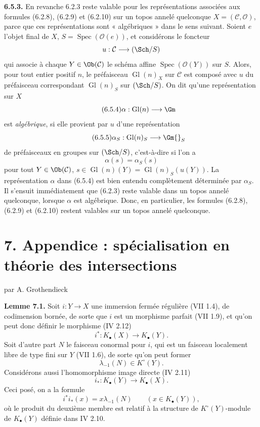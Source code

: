 \documentclass[11pt]{article}
\newcommand{\Spec}{\operatorname{Spec}}
\providecommand{\Gl}{\operatorname{Gl}}
\begin{document}
\textbf{6.5.3.} En revanche 6.2.3 reste valable pour les représentations associées aux formules (6.2.8), (6.2.9) et (6.2.10) sur un topos annelé quelconque \(X=(\mathcal C,\mathcal O)\), parce que ces représentations sont « algébriques » dans le sens suivant. Soient \(e\) l'objet final de \(X\), \(S=\Spec(\mathcal O(e))\), et considérons le foncteur
\[
 u:\mathcal C\longrightarrow(\Sch/S)
\]
qui associe à chaque \(Y\in\Ob(\mathcal C)\) le schéma affine \(\Spec(\mathcal O(Y))\) sur \(S\). Alors, pour tout entier positif \(n\), le préfaisceau \(\Gl(n)_X\) sur \(\mathcal C\) est composé avec \(u\) du préfaisceau correspondant \(\Gl(n)_S\) sur \((\Sch/S)\). On dit qu'une représentation sur \(X\)
\begin{equation}\tag{6.5.4}
 \alpha:\Gl(n)\longrightarrow\Gm
\end{equation}
est \emph{algébrique}, si elle provient par \(u\) d'une représentation
\begin{equation}\tag{6.5.5}
 \alpha_S:\Gl(n)_S\longrightarrow\Gm{}_{S}
\end{equation}
de préfaisceaux en groupes sur \((\Sch/S)\), c'est-à-dire si l'on a
\[
 \alpha(s)=\alpha_S(s)
\]
pour tout \(Y\in\Ob(\mathcal C)\), \(s\in\Gl(n)(Y)=\Gl(n)_S(u(Y))\). La représentation \(\alpha\) dans (6.5.4) est bien entendu complètement déterminée par \(\alpha_S\). Il s'ensuit immédiatement que (6.2.3) reste valable dans un topos annelé quelconque, lorsque \(\alpha\) est algébrique. Donc, en particulier, les formules (6.2.8), (6.2.9) et (6.2.10) restent valables sur un topos annelé quelconque.

\section*{7. Appendice : spécialisation en théorie des intersections}
\begin{center}
par A. Grothendieck
\end{center}

\textbf{Lemme 7.1.} Soit \(i:Y\to X\) une immersion fermée régulière (VII 1.4), de codimension bornée, de sorte que \(i\) est un morphisme parfait (VII 1.9), et qu'on peut donc définir le morphisme (IV 2.12)
\[
 i^*:K_\bullet(X)\longrightarrow K_\bullet(Y).
\]
Soit d'autre part \(N\) le faisceau conormal pour \(i\), qui est un faisceau localement libre de type fini sur \(Y\) (VII 1.6), de sorte qu'on peut former
\[
 \lambda_{-1}(N)\in K^\circ(Y).
\]
Considérons aussi l'homomorphisme image directe (IV 2.11)
\[
 i_*:K_\bullet(Y)\longrightarrow K_\bullet(X).
\]
Ceci posé, on a la formule
\[
 i^*i_*(x)=x\lambda_{-1}(N)\qquad(x\in K_\bullet(Y)),
\]
où le produit du deuxième membre est relatif à la structure de \(K^\circ(Y)\)-module de \(K_\bullet(Y)\) définie dans IV 2.10.
\end{document}
